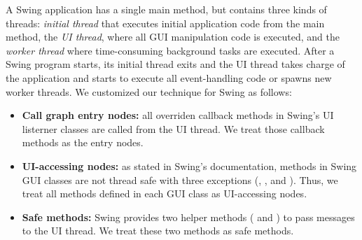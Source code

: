 
A Swing application has a single main method, but contains three kinds of
threads: \textit{initial thread} that executes initial application code from the main method,
the \textit{UI thread}, where all GUI manipulation code is executed,
and the \textit{worker thread} where time-consuming background tasks are executed.
After a Swing program starts, its initial thread exits and the UI thread takes charge
of the application and starts to execute all event-handling code or spawns new worker threads. 
We customized our technique for Swing as follows:

\begin{itemize}

\item \textbf{Call graph entry nodes: } all overriden callback methods in 
Swing's UI listerner classes are called from the UI thread. We treat those callback
methods as the entry nodes.


\item \textbf{UI-accessing nodes:} as stated in Swing's documentation, methods
in Swing GUI classes are not thread safe with three exceptions (,
, and ). Thus, we
treat all methods defined in each GUI class as UI-accessing nodes.

\item \textbf{Safe methods: }  Swing provides two helper methods
( and ) to pass messages to the UI thread.
We treat these two methods as safe methods.

\end{itemize}


